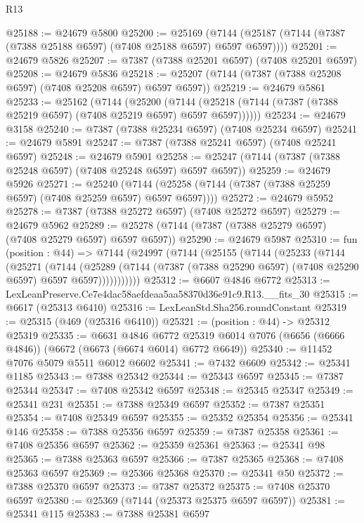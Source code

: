 \begin{lexlean}{R13}
\begin{coremodule}
@25188 := @24679 @5800
@25200 := @25169
    (@7144 (@25187 (@7144 (@7387 (@7388 @25188 @6597) (@7408 @25188 @6597) @6597 @6597))))
@25201 := @24679 @5826
@25207 := @7387 (@7388 @25201 @6597) (@7408 @25201 @6597)
@25208 := @24679 @5836
@25218 := @25207 (@7144 (@7387 (@7388 @25208 @6597) (@7408 @25208 @6597) @6597 @6597))
@25219 := @24679 @5861
@25233 := @25162
    (@7144
      (@25200
        (@7144 (@25218 (@7144 (@7387 (@7388 @25219 @6597) (@7408 @25219 @6597) @6597 @6597))))))
@25234 := @24679 @3158
@25240 := @7387 (@7388 @25234 @6597) (@7408 @25234 @6597)
@25241 := @24679 @5891
@25247 := @7387 (@7388 @25241 @6597) (@7408 @25241 @6597)
@25248 := @24679 @5901
@25258 := @25247 (@7144 (@7387 (@7388 @25248 @6597) (@7408 @25248 @6597) @6597 @6597))
@25259 := @24679 @5926
@25271 := @25240
    (@7144 (@25258 (@7144 (@7387 (@7388 @25259 @6597) (@7408 @25259 @6597) @6597 @6597))))
@25272 := @24679 @5952
@25278 := @7387 (@7388 @25272 @6597) (@7408 @25272 @6597)
@25279 := @24679 @5962
@25289 := @25278 (@7144 (@7387 (@7388 @25279 @6597) (@7408 @25279 @6597) @6597 @6597))
@25290 := @24679 @5987
@25310 := fun (position : @44) =>
  @7144
    (@24997
      (@7144
        (@25155
          (@7144
            (@25233
              (@7144
                (@25271
                  (@7144
                    (@25289
                      (@7144 (@7387 (@7388 @25290 @6597) (@7408 @25290 @6597) @6597 @6597)))))))))))
@25312 := @6607 @4846 @6772
@25313 := LexLeanPreserve.Ce7e4dac58aefdeaa5aa58370d36e91c9.R13.__fits_30
@25315 := @6617 (@25313 @6410)
@25316 := LexLeanStd.Sha256.roundConstant
@25319 := @25315 (@469 (@25316 @6410))
@25321 := (position : @44) -> @25312 @25319
@25335 := @6631
    @4846
    @6772
    @25319
    @6014
    @7076
    (@6656 (@6666 @4846))
    (@6672 (@6673 (@6674 @6014) @6772 @6649))
@25340 := @11452 @7076 @5079 @5511 @6012 @6602
@25341 := @7432 @6609
@25342 := @25341 @1185
@25343 := @7388 @25342
@25344 := @25343 @6597
@25345 := @7387 @25344
@25347 := @7408 @25342 @6597
@25348 := @25345 @25347
@25349 := @25341 @231
@25351 := @7388 @25349 @6597
@25352 := @7387 @25351
@25354 := @7408 @25349 @6597
@25355 := @25352 @25354
@25356 := @25341 @146
@25358 := @7388 @25356 @6597
@25359 := @7387 @25358
@25361 := @7408 @25356 @6597
@25362 := @25359 @25361
@25363 := @25341 @98
@25365 := @7388 @25363 @6597
@25366 := @7387 @25365
@25368 := @7408 @25363 @6597
@25369 := @25366 @25368
@25370 := @25341 @50
@25372 := @7388 @25370 @6597
@25373 := @7387 @25372
@25375 := @7408 @25370 @6597
@25380 := @25369 (@7144 (@25373 @25375 @6597 @6597))
@25381 := @25341 @115
@25383 := @7388 @25381 @6597

\end{coremodule}
\end{lexlean}
